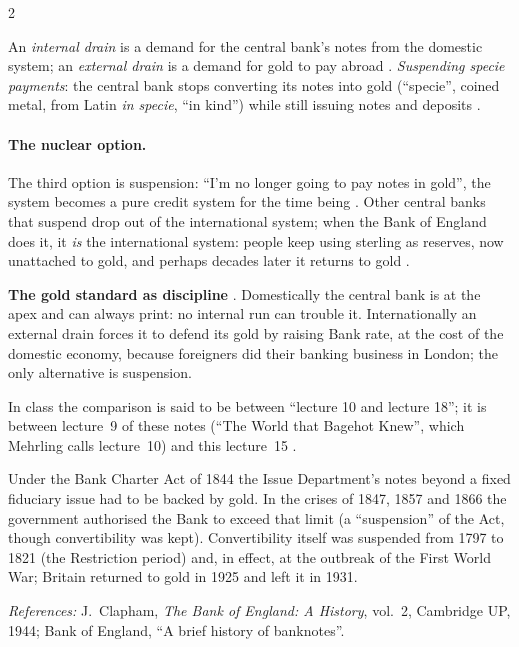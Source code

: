 \begin{paracol}{2}
\begin{definition}
An \emph{internal drain} is a demand for the central bank's notes from the domestic system; an \emph{external drain} is a demand for gold to pay abroad
. \emph{Suspending specie payments}: the central bank stops converting its notes into gold (``specie'', coined metal, from Latin
\emph{in specie}, ``in kind'') while still issuing notes and deposits .
\end{definition}

\paragraph{The nuclear option.} The third option is suspension: ``I'm no longer going to pay notes in gold'', the system becomes a pure credit system for the time
being . Other central banks that suspend drop out of the international system; when the Bank of England does it, it
\emph{is} the international system: people keep using sterling as reserves, now unattached to gold, and perhaps decades later it returns to gold
.

\begin{keyformulas}
\textbf{The gold standard as discipline} . Domestically the central bank is at the apex and can
always print: no internal run can trouble it. Internationally an external drain forces it to defend its gold by raising Bank rate, at the cost of the domestic
economy, because foreigners did their banking business in London; the only alternative is suspension.
\end{keyformulas}

\begin{coursenote}
In class the comparison is said to be between ``lecture 10 and lecture 18''; it is between lecture~9 of these notes (``The World that Bagehot Knew'', which
Mehrling calls lecture~10) and this lecture~15 .
\end{coursenote}

\begin{history}
Under the Bank Charter Act of 1844 the Issue Department's notes beyond a fixed fiduciary issue had to be backed by gold. In the crises of 1847, 1857 and 1866 the
government authorised the Bank to exceed that limit (a ``suspension'' of the Act, though convertibility was kept). Convertibility itself was suspended from 1797 to
1821 (the Restriction period) and, in effect, at the outbreak of the First World War; Britain returned to gold in 1925 and left it in 1931.\par
\emph{References:} J.~Clapham, \emph{The Bank of England: A History}, vol.~2, Cambridge UP, 1944; Bank of England, ``A brief history of banknotes''.
\end{history}


\end{paracol}
